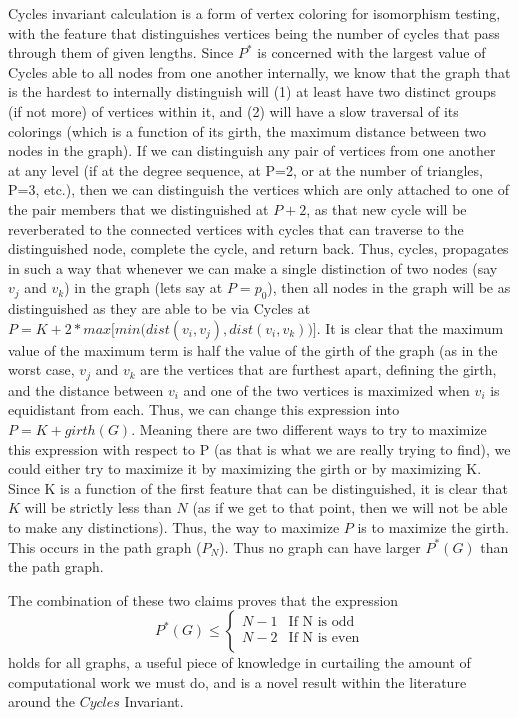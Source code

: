 Cycles invariant calculation is a form of vertex coloring for isomorphism testing, with the feature that distinguishes vertices being the number of cycles that pass through them of given lengths.
Since $P^*$ is concerned with the largest value of Cycles able to all nodes from one another internally, we know that the graph that is the hardest to internally distinguish will (1) at least have two distinct groups (if not more) of vertices within it, and (2) will have a slow traversal of its colorings (which is a function of its girth, the maximum distance between two nodes in the graph).
If we can distinguish any pair of vertices from one another at any level (if at the degree sequence, at P=2, or at the number of triangles, P=3, etc.), then we can distinguish the vertices which are only attached to one of the pair members that we distinguished at $P+2$, as that new cycle will be reverberated to the connected vertices with cycles that can traverse to the distinguished node, complete the cycle, and return back.
Thus, cycles, propagates in such a way that whenever we can make a single distinction of two nodes (say $v_j$ and $v_k$) in the graph (lets say at $P=p_0$), then all nodes in the graph will be as distinguished as they are able to be via Cycles at $P=K+2*max\big[min\big(dist(v_i,v_j), dist(v_i,v_k)\big)\big]$.
It is clear that the maximum value of the maximum term is half the value of the girth of the graph (as in the worst case, $v_j$ and $v_k$ are the vertices that are furthest apart, defining the girth, and the distance between $v_i$ and one of the two vertices is maximized when $v_i$ is equidistant from each. 
Thus, we can change this expression into $P=K+girth(G)$.
Meaning there are two different ways to try to maximize this expression with respect to P (as that is what we are really trying to find), we could either try to maximize it by maximizing the girth or by maximizing K.
Since K is a function of the first feature that can be distinguished, it is clear that $K$ will be strictly less than $N$ (as if we get to that point, then we will not be able to make any distinctions).
Thus, the way to maximize $P$ is to maximize the girth.
This occurs in the path graph ($P_N$).
Thus no graph can have larger $P^*(G)$ than the path graph.

The combination of these two claims proves that the expression 
\[ P^*(G) \leq \begin{cases} 
      N-1 & \text{If N is odd} \\
      N-2 & \text{If N is even} \\
   \end{cases}
\]
holds for all graphs, a useful piece of knowledge in curtailing the amount of computational work we must do, and is a novel result within the literature around the $Cycles$ Invariant. 

